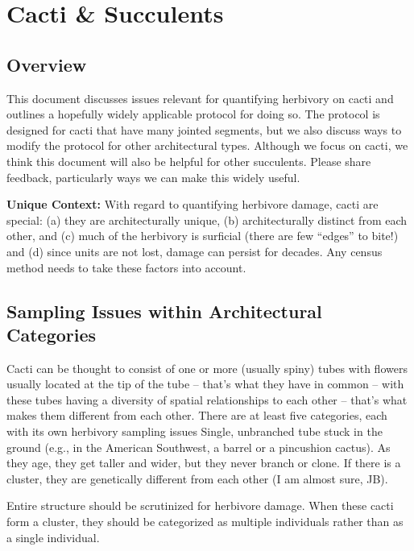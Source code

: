 \documentclass[
  letterpaper,
  oneside,
  open=any]{scrbook}
\begin{document}
\chapter{Cacti \& Succulents}\label{sec-succulents}

\section{Overview}\label{overview-2}

This document discusses issues relevant for quantifying herbivory on
cacti and outlines a hopefully widely applicable protocol for doing so.
The protocol is designed for cacti that have many jointed segments, but
we also discuss ways to modify the protocol for other architectural
types. Although we focus on cacti, we think this document will also be
helpful for other succulents. Please share feedback, particularly ways
we can make this widely useful.

\textbf{Unique Context: } With regard to quantifying herbivore damage,
cacti are special: (a) they are architecturally unique, (b)
architecturally distinct from each other, and (c) much of the herbivory
is surficial (there are few ``edges'' to bite!) and (d) since units are
not lost, damage can persist for decades. Any census method needs to
take these factors into account.

\section{Sampling Issues within Architectural
Categories}\label{sampling-issues-within-architectural-categories}

Cacti can be thought to consist of one or more (usually spiny) tubes
with flowers usually located at the tip of the tube -- that's what they
have in common -- with these tubes having a diversity of spatial
relationships to each other -- that's what makes them different from
each other. There are at least five categories, each with its own
herbivory sampling issues Single, unbranched tube stuck in the ground
(e.g., in the American Southwest, a barrel or a pincushion cactus). As
they age, they get taller and wider, but they never branch or clone. If
there is a cluster, they are genetically different from each other (I am
almost sure, JB).

Entire structure should be scrutinized for herbivore damage. When these
cacti form a cluster, they should be categorized as multiple individuals
rather than as a single individual.
\end{document}
